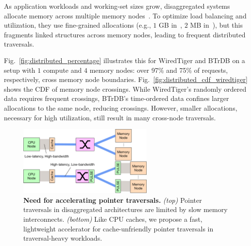  As application workloads and working-set sizes grow, disaggregated systems allocate memory across multiple memory nodes~\cite{legoos, mind, infiniswap, fastswap}. To optimize load balancing and utilization, they use fine-grained allocations (e.g., $1$ GB in~\cite{legoos}, $2$ MB in~\cite{mind}), but this fragments linked structures across memory nodes, leading to frequent distributed traversals.

Fig.~\ref{fig:distributed_percentage} illustrates this for WiredTiger and BTrDB on a setup with $1$ compute and $4$ memory nodes: over 97\% and 75\% of requests, respectively, cross memory node boundaries. Fig.~\ref{fig:distributed_cdf_wiredtiger} shows the CDF of memory node crossings. While WiredTiger’s randomly ordered data requires frequent crossings, BTrDB’s time-ordered data confines larger allocations to the same node, reducing crossings. However, smaller allocations, necessary for high utilization, still result in many cross-node traversals.


\begin{figure}[t]
  \centering
  \includegraphics[width=0.6\textwidth]{fig/pulse/disagg_vertical.pdf}
  \caption[Need for accelerating pointer traversals]{\textbf{Need for accelerating pointer traversals.} \textit{(top)} Pointer traversals in disaggregated architectures are limited by slow memory interconnects. \textit{(bottom)} Like CPU caches, we propose a fast, lightweight accelerator for cache-unfriendly pointer traversals in traversal-heavy workloads.} 
  \label{fig:disagg}
\end{figure}

